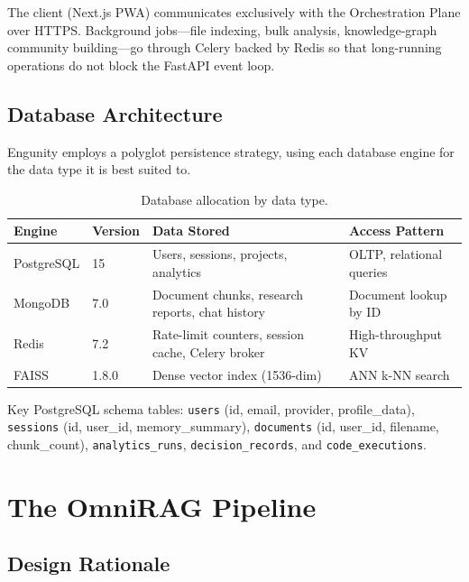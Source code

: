 The client (Next.js PWA) communicates exclusively with the Orchestration Plane over HTTPS. Background jobs---file indexing, bulk analysis, knowledge-graph community building---go through Celery backed by Redis so that long-running operations do not block the FastAPI event loop.

\subsection{Database Architecture}
\label{subsec:database}

Engunity employs a polyglot persistence strategy, using each database engine for the data type it is best suited to.

\begin{table}[ht]
    \centering
    \caption{Database allocation by data type.}
    \label{tab:databases}
    \renewcommand{\arraystretch}{1.3}
    \begin{tabular}{llp{5.5cm}p{4.5cm}}
        \toprule
        \textbf{Engine} & \textbf{Version} & \textbf{Data Stored} & \textbf{Access Pattern} \\
        \midrule
        PostgreSQL & 15 & Users, sessions, projects, analytics & OLTP, relational queries \\
        MongoDB    & 7.0 & Document chunks, research reports, chat history & Document lookup by ID \\
        Redis      & 7.2 & Rate-limit counters, session cache, Celery broker & High-throughput KV \\
        FAISS      & 1.8.0 & Dense vector index (1536-dim) & ANN k-NN search \\
        \bottomrule
    \end{tabular}
\end{table}

Key PostgreSQL schema tables: \texttt{users} (id, email, provider, profile\_data), \texttt{sessions} (id, user\_id, memory\_summary), \texttt{documents} (id, user\_id, filename, chunk\_count), \texttt{analytics\_runs}, \texttt{decision\_records}, and \texttt{code\_executions}.

\section{The OmniRAG Pipeline}
\label{sec:omnirag}

\subsection{Design Rationale}
\label{subsec:omnirag-rationale}

